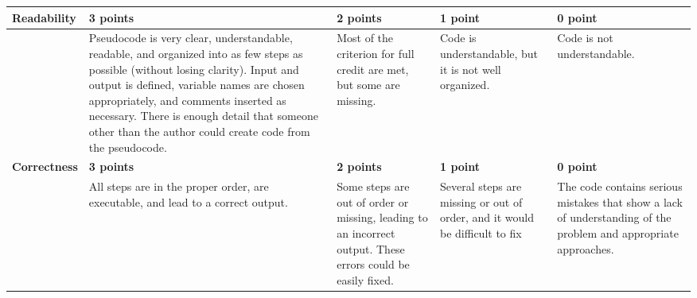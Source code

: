 \documentclass[12pt,landscape]{article}
\begin{document}
{\renewcommand{\arraystretch}{2}
\begin{tabular}{|p{2.3cm}|p{6cm}|p{4.2cm}|p{4.2cm}|p{4.2cm}|}
\hline
{\bf Readability }& {\bf 3 points} & {\bf 2 points} & {\bf 1 point}& {\bf 0 point} \\
\hline
& 
 Pseudocode is very clear, understandable, readable, and organized into as few steps as possible (without losing clarity). Input and output is defined, variable names are chosen appropriately, and comments inserted as necessary. There is enough detail that someone other than the author could create code from the pseudocode.& 
 Most of the criterion for full credit are met, but some are missing. & Code is understandable, but it is not well organized. & 
 Code is not understandable.\\
{\bf Correctness }& {\bf 3 points} & {\bf 2 points} & {\bf 1 point}& {\bf 0 point} \\
\hline
&All steps are in the proper order, are executable, and lead to a correct output.& Some steps are out of order or missing, leading to an incorrect output. These errors could be easily fixed. & 
Several steps are missing or out of order, and it would be difficult to fix& The code contains serious mistakes that show a lack of understanding of the problem and appropriate approaches.\\
\hline

 \end{tabular}
}
\end{document}
